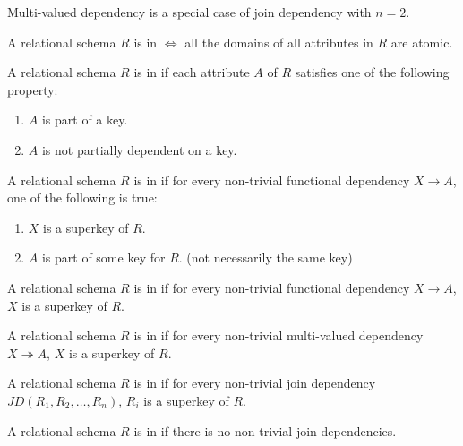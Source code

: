 Multi-valued dependency is a special case of join dependency with $n=2$.

\begin{definition}[1NF]
    A relational schema $R$ is in  $\iff$ all the domains of all attributes in $R$ are atomic.
\end{definition}

\begin{definition}[2NF]
    A relational schema $R$ is in  if each attribute $A$ of $R$ satisfies one of the following property:
    \begin{enumerate}
        \item $A$ is part of a key.
        \item $A$ is not partially dependent on a key.
    \end{enumerate}
\end{definition}

\begin{definition}[3NF]
    A relational schema $R$ is in  \cite{Codd1983a} if for every non-trivial functional dependency $X \rightarrow A$, one of the following is true:
    \begin{enumerate}
        \item $X$ is a superkey of $R$.
        \item $A$ is part of some key for $R$. (not necessarily the same key)
    \end{enumerate}
\end{definition}

\begin{definition}
    A relational schema $R$ is in  \cite{Codd1972} if for every non-trivial functional dependency $X \rightarrow A$, $X$ is a superkey of $R$.
\end{definition}

\begin{definition}[4NF]
    A relational schema $R$ is in  \cite{Fagin1977} if for every non-trivial multi-valued dependency $X \twoheadrightarrow A$, $X$ is a superkey of $R$.
\end{definition}


\begin{definition}[5NF]
    A relational schema $R$ is in  \cite{Fagin1979} if for every non-trivial join dependency $JD(R_1, R_2, \dots, R_n)$, $R_i$ is a superkey of $R$.
\end{definition}


\begin{definition}[6NF]
    A relational schema $R$ is in  \cite{Date2003} if there is no non-trivial join dependencies.
\end{definition}


